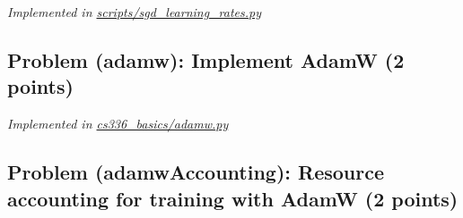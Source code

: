\documentclass[letterpaper]{article}
\begin{document}
\textit{Implemented in  \href{https://github.com/echung32/ece405-assignment1-basics/blob/main/scripts/sgd_learning_rates.py}{scripts/sgd\_learning\_rates.py}}

\subsection{Problem (adamw): Implement AdamW (2 points)}

\textit{Implemented in  \href{https://github.com/echung32/ece405-assignment1-basics/blob/main/cs336_basics/optimizer/adamw.py}{cs336\_basics/adamw.py}}

\subsection{Problem (adamwAccounting): Resource accounting for training with AdamW (2 points)}
\end{document}
